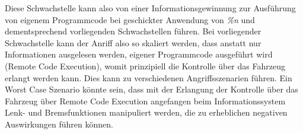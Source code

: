 \documentclass[a4paper,
DIV=13,
12pt,
BCOR=10mm,
department=FakIM,
oneside,
parskip=half,
automark,
listof=totocnumbered,
bibliography=totocnumbered,
acronym=totocnumbered
] {OTHRartcl}
\begin{document}
Diese Schwachstelle kann also von einer Informationsgewinnung zur Ausführung von eigenem Programmcode bei geschickter Anwendung von \textit{\%n} und dementsprechend vorliegenden Schwachstellen führen.
Bei vorliegender Schwachstelle kann der Anriff also so skaliert werden, dass anstatt nur Informationen ausgelesen werden, eigener Programmcode ausgeführt wird (Remote Code Execution),
womit prinzipiell die Kontrolle über das Fahrzeug erlangt werden kann.
Dies kann zu verschiedenen Angriffsszenarien führen. Ein Worst Case Szenario könnte sein, dass mit der Erlangung der Kontrolle über das Fahrzeug über Remote Code Execution angefangen beim
Informationssystem Lenk- und Bremsfunktionen manipuliert werden, die zu erheblichen negativen Auswirkungen führen können. \cite{car format string vuln.}

\end{document}
